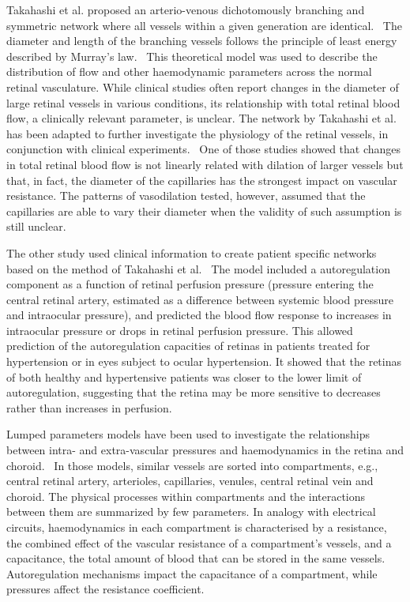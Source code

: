 \documentclass[12pt,a4paper]{journal}
\begin{document}
Takahashi et al. proposed an arterio-venous dichotomously branching and symmetric network where all vessels within a given generation are identical.~\cite{Takahashi_2009}
The diameter and length of the branching vessels follows the principle of least energy described by Murray's law.~\cite{Murray_1926}
This theoretical model was used to describe the distribution of flow and other haemodynamic parameters across the normal retinal vasculature.
While clinical studies often report changes in the diameter of large retinal vessels in various conditions, its relationship with total retinal blood flow, a clinically relevant parameter, is unclear.
The network by Takahashi et al. has been adapted to further investigate the physiology of the retinal vessels, in conjunction with clinical experiments.~\cite{Aschinger_2017,Pappelis_2020}
One of those studies showed that changes in total retinal blood flow is not linearly related with dilation of larger vessels but that, in fact, the diameter of the capillaries has the strongest impact on vascular resistance.
The patterns of vasodilation tested, however, assumed that the capillaries are able to vary their diameter when the validity of such assumption is still unclear.~\cite{Kur_2012}

The other study used clinical information to create patient specific networks based on the method of Takahashi et al.~\cite{Pappelis_2020}
The model included a autoregulation component as a function of retinal perfusion pressure (pressure entering the central retinal artery, estimated as a difference between systemic blood pressure and intraocular pressure), and predicted the blood flow response to increases in intraocular pressure or drops in retinal perfusion pressure.
This allowed prediction of the autoregulation capacities of retinas in patients treated for hypertension or in eyes subject to ocular hypertension.
It showed that the retinas of both healthy and hypertensive patients was closer to the lower limit of autoregulation, suggesting that the retina may be more sensitive to decreases rather than increases in perfusion.~\cite{Pappelis_2020}


Lumped parameters models have been used to investigate the relationships between intra- and extra-vascular pressures and haemodynamics in the retina and choroid.~\cite{Chiaravalli_2021,Fawzi_2019,Guidoboni_2014a,Nelson_2017,Petersen_2022,Prudhomme_2021,Sala_2020,Salerni_2019}
In those models, similar vessels are sorted into compartments, e.g., central retinal artery, arterioles, capillaries, venules, central retinal vein and choroid.
The physical processes within compartments and the interactions between them are summarized by few parameters.
In analogy with electrical circuits, haemodynamics in each compartment is characterised by a resistance, the combined effect of the vascular resistance of a compartment's vessels, and a capacitance, the total amount of blood that can be stored in the same vessels.
Autoregulation mechanisms impact the capacitance of a compartment, while pressures affect the resistance coefficient.
\end{document}
